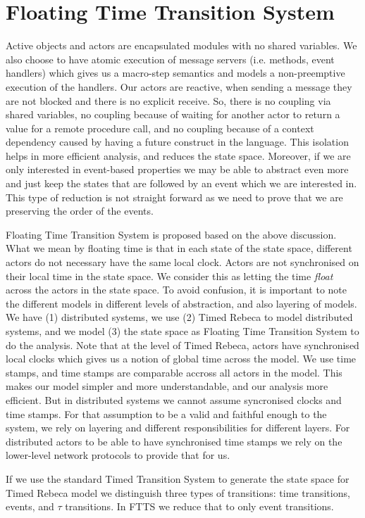 \section{Floating Time Transition System} \label{sec::FTTS}
Active objects and actors are encapsulated modules with no shared variables. We also choose to have atomic execution of message servers (i.e. methods, event handlers) which gives us a macro-step semantics and models a non-preemptive execution of the handlers.
Our actors are reactive, when sending a message they are not blocked and there is no explicit receive. So, there is no coupling via shared variables, no coupling because of waiting for another actor to return a value for a remote procedure call, and no coupling because of a context dependency caused by having a future  construct in the language.
This isolation helps in more efficient analysis, and reduces the state space.
Moreover, if we are only interested in event-based properties we may be able to abstract even more and just keep the states that are followed by an event which we are interested in. This type of reduction is not straight forward as we need to prove that we are preserving the order of the events.

Floating Time Transition System is proposed based on the above discussion. What we mean by floating time is that in each state of the state space, different actors do not necessary have the same local clock. Actors are not synchronised on their local time in the state space. We consider this as letting the time \textit{float} across the actors in the state space. 
To avoid confusion, it is important to note the different models in different levels of abstraction, and also layering of models. We have (1) distributed systems, we use (2) Timed Rebeca to model distributed systems, and we model (3) the state space as Floating Time Transition System to do the analysis. 
%
Note that at the level of Timed Rebeca, actors have synchronised local clocks which gives us a notion of global time across the model. We use time stamps, and time stamps are comparable accross all actors in the model. This makes our model simpler and more understandable, and our analysis more efficient.
But in distributed systems we cannot assume syncronised clocks and time stamps. 
For that assumption to be a valid and faithful enough to the system,  we rely on layering and different responsibilities for different layers. For distributed actors to be able to have synchronised time stamps we rely on the lower-level network protocols to provide that for us. 

If we use the standard Timed Transition System to generate the state space for Timed Rebeca model we distinguish three types of transitions: time transitions, events, and $\tau$ transitions.
In FTTS we reduce that to only event transitions.




